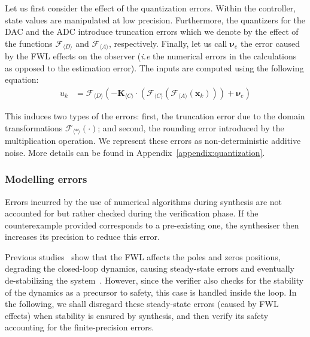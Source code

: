\documentclass[sigconf]{llncs}
\newcommand{\mat}[1]{\boldsymbol{#1}}
\renewcommand{\vec}[1]{\boldsymbol{#1}}
\begin{document}
Let us first consider the effect of the quantization errors. 
Within the controller, state values are manipulated at low precision.
Furthermore, the quantizers for the DAC and the ADC introduce truncation errors
which we denote by the effect of the functions $\mathcal{F}_{\langle D \rangle}$
and $\mathcal{F}_{\langle A \rangle}$, respectively. Finally, let us call $\vec{\nu}_e$ the
error caused by the FWL effects on the observer
(\emph{i.e} the numerical errors 
in the calculations as opposed to the estimation error).
The inputs are computed using the following equation: 
%
\begin{align}
u_{k}&=\mathcal{F}_{\langle D \rangle}\left(-\mat{K}_{\langle C \rangle}\cdot\left(\mathcal{F}_{\langle C \rangle}\left(\mathcal{F}_{\langle A \rangle}(\vec{x}_{k})\right)\right) +\vec{\nu}_e\right)
\label{eq:uk}
\end{align}

This induces two types of the errors: first, the truncation
error due to the domain transformations $\mathcal{F}_{\langle *
\rangle}(\cdot)$; and second, the rounding error introduced by the
multiplication operation.  We represent these errors as non-deterministic
additive noise. More details can be found in Appendix~\ref{appendix:quantization}.

\subsubsection{Modelling errors}

Errors incurred by the use of numerical algorithms during synthesis are not
accounted for but rather checked during the verification phase.  If the
counterexample provided corresponds to a pre-existing one, the synthesiser
then increases its precision to reduce this error.

Previous studies~\cite{gangli1} show that the FWL affects the poles and
zeros positions, degrading the closed-loop dynamics, causing steady-state
errors and eventually de-stabilizing the system~\cite{Bessa16}.  However,
since the verifier also checks for the stability of the dynamics as a
precursor to safety, this case is handled inside the loop.  In the
following, we shall disregard these steady-state errors (caused by FWL
effects) when stability is ensured by synthesis, and then verify its safety
accounting for the finite-precision errors.
\end{document}
